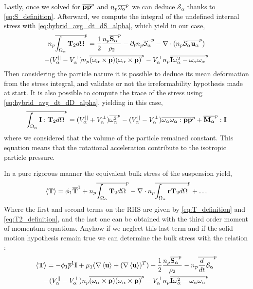 Lastly, once we solved for $\overline{\textbf{pp}}^{p}$ and $n_p\overline{\omega_\alpha}^{p}$ we can deduce $\mathcal{S}_\alpha$ thanks to \ref{eq:S_definition}.
Afterward, we compute the integral of the undefined internal stress with \ref{eq:hybrid_avg_dt_dS_alpha}, which yield in our case, 
\begin{multline}
    n_p\overline{\int_{\Omega_\alpha} 
        \mathbf{T}_2
    d\Omega}^{p}
    =  
      \frac{1}{2}\frac{n_p\overline{\textbf{S}_\alpha}^{p}}{\rho_2}
    - \partial_t n_p\overline{\mathcal{S}_\alpha}^{p}
    - \mathbf{\nabla}\cdot(n_p\overline{\mathcal{S}_\alpha \textbf{u}_\alpha}^{p})\\
    - (V_\alpha^{||} - V_\alpha^\bot) n_p\overline{
        (\omega_\alpha \times \textbf{p}) (\omega_\alpha \times \textbf{p}) }^{p} 
    -V_\alpha^\bot n_p\overline{\textbf{I} \omega_\alpha^2 -\omega_\alpha\omega_\alpha }^{p}
    \label{eq:T2_definition}
\end{multline}
Then considering the particle nature it is possible to deduce its mean deformation from the stress integral, and validate or not the irreformability hypothesis made at start. 
It is also possible to compute the trace of the stress using \ref{eq:hybrid_avg_dt_dD_alpha}, yielding in this case, 
\begin{equation}
    \overline{\int_{\Omega_\alpha} 
        \textbf{I}:\mathbf{T}_2
    d\Omega}^{p}
    =  
     (V_\alpha^{||} + V_\alpha^\bot) \overline{
    \omega_\alpha^2}^{p} 
    - (V_\alpha^{||} - V_\alpha^\bot) \overline{
    \omega_\alpha\omega_\alpha :  \textbf{pp}}^{p}
    + \overline{\textbf{M}_\alpha}^{p} : \textbf{I}
\end{equation}
where we considered that the volume of the particle remained constant. 
This equation means that the rotational acceleration contribute to the isotropic particle pressure. 


In a pure rigorous manner the equivalent bulk stress of the suspension yield, 
\begin{equation*}
    \left<\textbf{T}\right> = 
    \phi_1 \overline{\textbf{T}}^1 
    + n_p\overline{\int_{\Omega_\alpha} \mathbf{T}_2 d\Omega}^{p}
    -\mathbf{\nabla}\cdot n_p\overline{\int_{\Omega_\alpha} \textbf{r}\mathbf{T}_2 d\Omega}^{p}
    + \ldots
\end{equation*}
Where the first and second terms on the RHS are given by \ref{eq:T_definition} and \ref{eq:T2_definition}, and the last one can be obtained with the third order moment of momentum equations. 
Anyhow if we neglect this last term and if the solid motion hypothesis remain true we can determine the bulk stress with the relation :
\begin{multline*}
    \left<\textbf{T}\right> = 
    - \phi_1\overline{p}^1\textbf{I} 
    + \mu_1(\mathbf{\nabla} \left<\textbf{u}\right> + (\mathbf{\nabla} \left<\textbf{u}\right>)^T) 
    + \frac{1}{2}\frac{n_p\overline{\textbf{S}_\alpha}^{p}}{\rho_2}
    - n_p\overline{\frac{d}{d t} \mathcal{S}_\alpha}^{p}\\
    - (V_\alpha^{||} - V_\alpha^\bot) n_p\overline{
        (\omega_\alpha \times \textbf{p}) (\omega_\alpha \times \textbf{p}) }^{p} 
    -V_\alpha^\bot n_p\overline{\textbf{I} \omega_\alpha^2 -\omega_\alpha\omega_\alpha }^{p}
\end{multline*}

